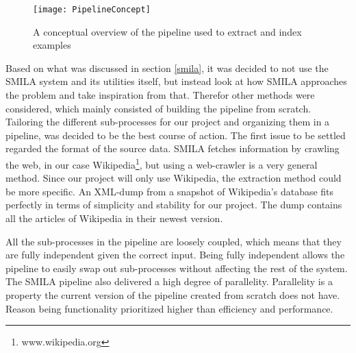 
\begin{figure}[h]
\caption{A conceptual overview of the pipeline used to extract and index examples}
\texttt{[image: PipelineConcept]}
\end{figure}



Based on what was discussed in section \ref{smila}, it was decided to not use the SMILA system and its utilities itself, but instead look at how SMILA approaches the problem and take inspiration from that. Therefor other methods were considered, which mainly consisted of building the pipeline from scratch. Tailoring the different sub-processes for our project and organizing them in a pipeline, was decided to be the best course of action. The first issue to be settled regarded the format of the source data. SMILA fetches information by crawling the web, in our case Wikipedia\footnote{www.wikipedia.org}, but using a web-crawler is a very general method. Since our project will only use Wikipedia, the extraction method could be more specific. An XML-dump from a snapshot of Wikipedia's database fits perfectly in terms of simplicity and stability for our project. The dump contains all the articles of Wikipedia in their newest version.


All the sub-processes in the pipeline are loosely coupled, which means that they are fully independent given the correct input. Being fully independent allows the pipeline to easily swap out sub-processes without affecting the rest of the system. The SMILA pipeline also delivered a high degree of parallelity. Parallelity is a property the current version of the pipeline created from scratch does not have. Reason being functionality prioritized higher than efficiency and performance. 

